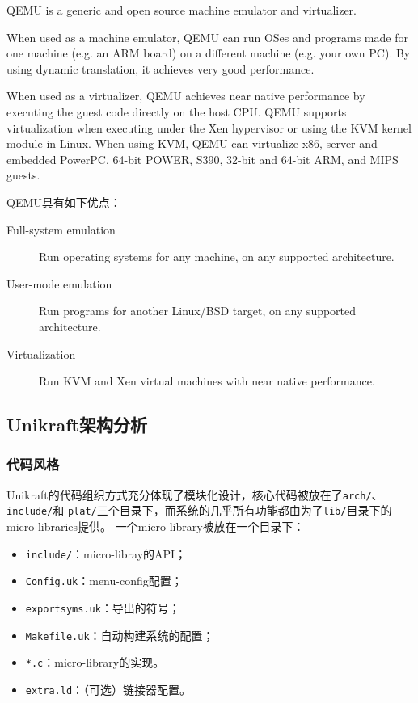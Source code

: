 \documentclass{../runikraft-report}
\begin{document}
QEMU is a generic and open source machine emulator and virtualizer.

When used as a machine emulator, QEMU can run OSes and programs made for
one machine (e.g. an ARM board) on a different machine (e.g. your own PC).
By using dynamic translation, it achieves very good performance.

When used as a virtualizer, QEMU achieves near native performance by executing
the guest code directly on the host CPU. QEMU supports virtualization when executing
under the Xen hypervisor or using the KVM kernel module in Linux. When using KVM,
QEMU can virtualize x86, server and embedded PowerPC, 64-bit POWER, S390, 32-bit
and 64-bit ARM, and MIPS guests.\cite{1}

\noindent QEMU具有如下优点：

\begin{description}
\item[Full-system emulation] Run operating systems for any machine, on any supported architecture.
\item[User-mode emulation] Run programs for another Linux/BSD target, on any supported architecture.
\item[Virtualization] Run KVM and Xen virtual machines with near native performance.\cite{1}
\end{description}

\subsection{Unikraft架构分析}
\subsubsection{代码风格}\label{ssubsec:code-style}
Unikraft的代码组织方式充分体现了模块化设计，核心代码被放在了\texttt{arch/}、\texttt{include/}和
\texttt{plat/}三个目录下，而系统的几乎所有功能都由为了\texttt{lib/}目录下的micro-libraries提供。
一个micro-library被放在一个目录下：
\begin{itemize}
\item \texttt{include/}：micro-libray的API；
\item \texttt{Config.uk}：menu-config配置；
\item \texttt{exportsyms.uk}：导出的符号；
\item \texttt{Makefile.uk}：自动构建系统的配置；
\item \texttt{*.c}：micro-library的实现。
\item \texttt{extra.ld}：（可选）链接器配置。
\end{itemize}
\end{document}
